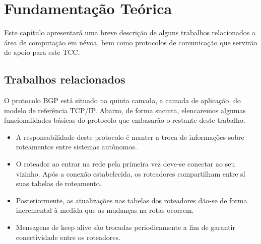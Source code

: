 \chapter{\label{chap:chap2} Fundamentação Teórica}

Este capítulo apresentará uma breve descrição de alguns trabalhos relacionados a área de computação em névoa, bem como protocolos de comunicação que servirão de apoio para este TCC.


\section{Trabalhos relacionados}


O protocolo BGP está situado na quinta camada, a camada de aplicação, do modelo de referência TCP/IP\cite{tanenbaum2011redes}.
Abaixo, de forma sucinta, elencaremos algumas funcionalidades básicas do protocolo que embasarão o restante deste trabalho.

\begin{itemize}
    \item A responsabilidade deste protocolo é manter a troca de informações sobre roteamentos entre sistemas autônomos\cite{Rekhter:1995}.
    \item O roteador ao entrar na rede pela primeira vez deve-se conectar ao seu vizinho. Após a conexão estabelecida, os roteadores compartilham entre sí suas tabelas de roteamento\cite{Rekhter:1995}.
    \item Posteriormente, as atualizações nas tabelas dos roteadores dão-se de forma incremental à medida que as mudanças na rotas ocorrem\cite{Rekhter:1995}.
    \item Mensagens de keep alive são trocadas periodicamente a fim de garantir conectividade entre os roteadores\cite{Rekhter:1995}.
\end{itemize}




